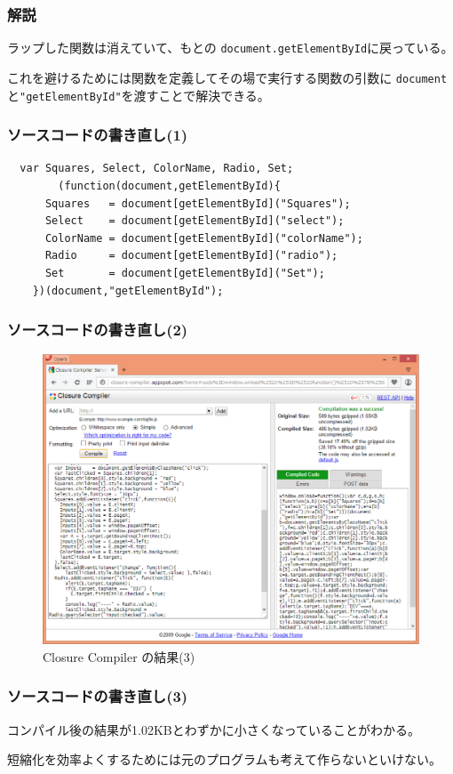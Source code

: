 \documentclass[dvipsk]{beamer}
\begin{document}
\begin{frame}[containsverbatim]
 \frametitle{解説}
ラップした関数は消えていて、もとの
 \texttt{document.getElementById}に戻っている。

 これを避けるためには関数を定義してその場で実行する関数の引数に
 \texttt{document}と\texttt{"getElementById"}を渡すことで解決できる。

 
\end{frame}
\begin{frame}[containsverbatim]
 \frametitle{ソースコードの書き直し(1)}
 {\small
\begin{verbatim}
  var Squares, Select, ColorName, Radio, Set;
		(function(document,getElementById){
      Squares   = document[getElementById]("Squares");
      Select    = document[getElementById]("select");
      ColorName = document[getElementById]("colorName");
      Radio     = document[getElementById]("radio");
      Set       = document[getElementById]("Set");
	})(document,"getElementById");
\end{verbatim}
}
\end{frame}
\begin{frame}[containsverbatim]
 \frametitle{ソースコードの書き直し(2)}
 \begin{figure}[ht]
	\begin{center}
	 \includegraphics[width=1\textwidth]{../10-01closur-compiler-res03.eps}
	\end{center}
 \caption{Closure Compiler の結果(3)}\label{closure-compiler-res03}
 \end{figure}
\end{frame}
\begin{frame}[containsverbatim]
 \frametitle{ソースコードの書き直し(3)}
 コンパイル後の結果が1.02KBとわずかに小さくなっていることがわかる。

 短縮化を効率よくするためには元のプログラムも考えて作らないといけない。
\end{frame}
\end{document}
